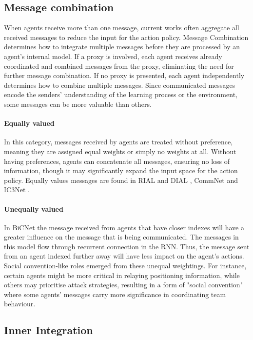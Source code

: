\documentclass{article}
\begin{document}
\subsection{Message combination}

When agents receive more than one message, current works often aggregate all received messages to reduce the input for the action policy. Message Combination determines how to integrate multiple messages before they are processed by an agent’s internal model. If a proxy is involved, each agent receives already coordinated and combined messages from the proxy, eliminating the need for further message combination. If no proxy is presented, each agent independently determines how to combine multiple messages. Since communicated messages encode the senders’ understanding of the learning process or the environment, some messages can be more valuable than others. 

\paragraph{Equally valued} In this category, messages received by agents are treated without preference, meaning they are assigned equal weights or simply no weights at all. Without having preferences, agents can concatenate all messages, ensuring no loss of information, though it may significantly expand the input space for the action policy. Equally values messages are found in RIAL and DIAL \citep{foerster2016learning}, CommNet \citep{sukhbaatar2016commnet} and IC3Net \citep{singh2018ic3net}. 

\paragraph{Unequally valued} In BiCNet \citep{peng2017bicnet} the message received from agents that have closer indexes will have a greater influence on the message that is being communicated. The messages in this model flow through recurrent connection in the RNN. Thus, the message sent from an agent indexed further away will have less impact on the agent's actions. Social convention-like roles emerged from these unequal weightings. For instance, certain agents might be more critical in relaying positioning information, while others may prioritise attack strategies, resulting in a form of "social convention" where some agents’ messages carry more significance in coordinating team behaviour.

\subsection{Inner Integration}
\end{document}
